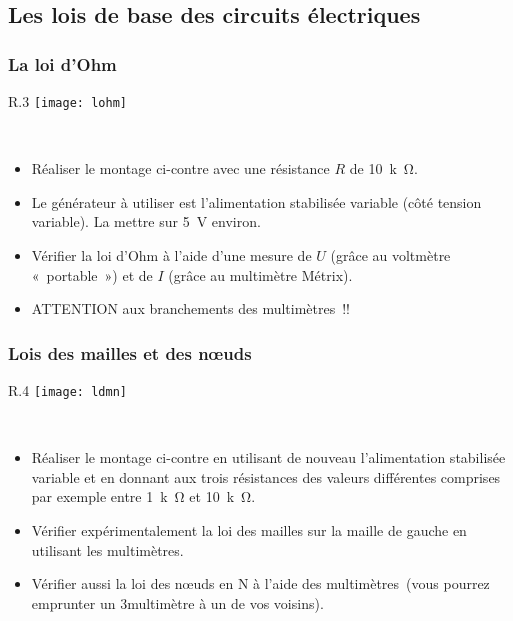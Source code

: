 \documentclass[../main/main.tex]{subfiles}
\begin{document}
\subsection{Les lois de base des circuits électriques}
\subsubsection{La loi d'Ohm}
\begin{wrapfigure}[5]{R}{.3\linewidth}
	\centering
	\texttt{[image: lohm]}
\end{wrapfigure}
~\vspace{-20pt}
\begin{itemize}
	\item Réaliser le montage ci-contre avec une résistance $R$ de
	      \SI{10}{k\ohm}.
	\item Le générateur à utiliser est l’alimentation stabilisée variable (côté
	      tension variable). La mettre sur \SI{5}{V} environ.
	\item Vérifier la loi d’Ohm à l’aide d’une mesure de $U$ (grâce au voltmètre
	      «~portable~») et de $I$ (grâce au multimètre Métrix).
	\item ATTENTION aux branchements des multimètres !!
\end{itemize}

\subsubsection{Lois des mailles et des nœuds}
\begin{wrapfigure}[5]{R}{.4\linewidth}
	\centering
	\texttt{[image: ldmn]}
\end{wrapfigure}
~\vspace{-20pt}
\begin{itemize}
	\item Réaliser le montage ci-contre en utilisant de nouveau l’alimentation
	      stabilisée variable et en donnant aux trois résistances des valeurs
	      différentes comprises par exemple entre \SI{1}{k\ohm} et \SI{10}{k\ohm}.
	\item Vérifier expérimentalement la loi des mailles sur la maille de gauche
	      en utilisant les multimètres.
	\item Vérifier aussi la loi des nœuds en N à l’aide des multimètres (vous
	      pourrez emprunter un 3\ieme multimètre à un de vos voisins).
\end{itemize}
\end{document}

